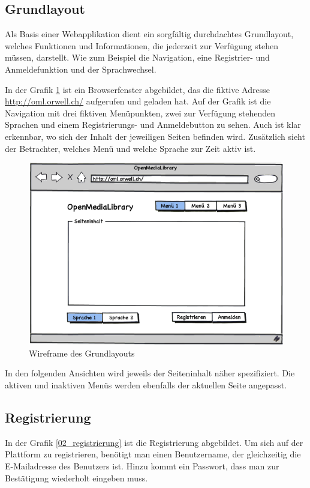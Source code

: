 \subsection{Grundlayout}
Als Basis einer Webapplikation dient ein sorgfältig durchdachtes Grundlayout, welches
Funktionen und Informationen, die jederzeit zur Verfügung stehen müssen, darstellt.
Wie zum Beispiel die Navigation, eine Registrier- und Anmeldefunktion und der Sprachwechsel.

In der Grafik \ref{01_grundlayout} ist ein Browserfenster abgebildet, das die
fiktive Adresse \url{http://oml.orwell.ch/} aufgerufen und geladen hat. Auf der Grafik
ist die Navigation mit drei fiktiven Menüpunkten, zwei zur Verfügung stehenden 
Sprachen und einem Registrierungs- und Anmeldebutton zu sehen. Auch ist klar erkennbar,
wo sich der Inhalt der jeweiligen Seiten befinden wird. Zusätzlich sieht der Betrachter, welches
Menü und welche Sprache zur Zeit aktiv ist.

\begin{figure}[ht]
    \begin{center}
        \includegraphics[width=1\textwidth,angle=0]{./wireframes/01_grundlayout.png}
        \caption{Wireframe des Grundlayouts}
        \label{01_grundlayout}
    \end{center}
\end{figure}

In den folgenden Ansichten wird jeweils der Seiteninhalt näher spezifiziert. Die
aktiven und inaktiven Menüs werden ebenfalls der aktuellen Seite angepasst.

\subsection{Registrierung}
In der Grafik \ref{02_registrierung} ist die Registrierung abgebildet. Um sich
auf der Plattform zu registrieren, benötigt man einen Benutzername, der gleichzeitig
die E-Mailadresse des Benutzers ist. Hinzu kommt ein Passwort, dass man zur 
Bestätigung wiederholt eingeben muss.

